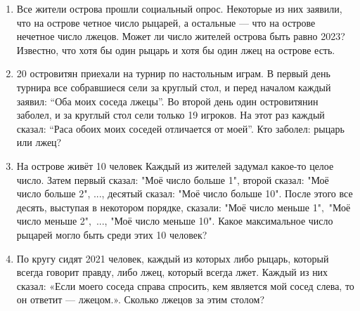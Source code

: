 \documentclass{article}
\begin{document}
\begin{enumerate}[label*=\protect\fbox{\arabic{enumi}}]
	\item Все жители острова прошли социальный опрос. Некоторые из них заявили, что на острове четное число рыцарей, а остальные — что на острове нечетное число лжецов. Может ли число жителей острова быть равно 2023? Известно, что хотя бы один рыцарь и хотя бы один лжец на острове есть.
	
	\item 20 островитян приехали на турнир по настольным играм. В первый день турнира все собравшиеся сели за круглый стол, и перед началом каждый заявил: “Оба моих соседа лжецы”. Во второй день один островитянин заболел, и за круглый стол сели только 19 игроков. На этот раз каждый сказал: “Раса обоих моих соседей отличается от моей”. Кто заболел: рыцарь или лжец?
	
	\item На острове живёт 10 человек Каждый из жителей задумал какое-то целое число. 
	Затем первый сказал: "Моё число больше 1", второй сказал: "Моё число больше 2", ..., десятый сказал: "Моё число больше 10". 
	После этого все десять, выступая в некотором порядке, сказали: "Моё число меньше 1"$,$ "Моё число меньше 2"$,$ ..., "Моё число меньше 10".
	Какое максимальное число рыцарей могло быть среди этих 10 человек?
	
	\item По кругу сидят 2021 человек, каждый из которых либо рыцарь, который всегда говорит правду, либо лжец, который всегда лжет. Каждый из них сказал: «Если моего соседа справа спросить, кем является мой сосед слева, то он ответит — лжецом.». Сколько лжецов за этим столом?
	
\end{enumerate}
\end{document}
